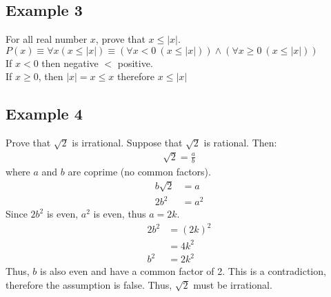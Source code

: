 \documentclass{article}
\theoremstyle{mytheoremstyle}
\theoremstyle{mytheoremstyle}
\theoremstyle{myproblemstyle}
\begin{document}
    \subsection*{Example 3}
    For all real number $x$, prove that $x \le |x|$. \\
    $P(x)\equiv\forall x (x\le|x|)\equiv (\forall x<0\ (x\le |x|)) \wedge
    (\forall x \ge 0\ (x\le|x|))$ \\
    If $x<0$ then negative $<$ positive. \\
    If $x\ge 0$, then $|x| = x \le x$
    therefore $x\le |x|$

    \subsection*{Example 4}
    Prove that $\sqrt{2}$ is irrational.
    Suppose that $\sqrt{2}$ is rational. Then:
    \begin{align*}
        \sqrt{2} = \frac{a}{b}
    \end{align*}
    where $a$ and $b$ are coprime (no common factors).
    \begin{align*}
        b\sqrt{2} &= a \\
        2b^2 &= a^2
    \end{align*}
    Since $2b^2$ is even, $a^2$ is even, thus $a=2k$.
    \begin{align*}
        2b^2 &= (2k)^2 \\
             &= 4k^2 \\
        b^2  &= 2k^2
    \end{align*}
    Thus, $b$ is also even and have a common factor of 2. This is a
    contradiction, therefore the assumption is false. Thus, $\sqrt{2}$ must be
    irrational.
\end{document}
